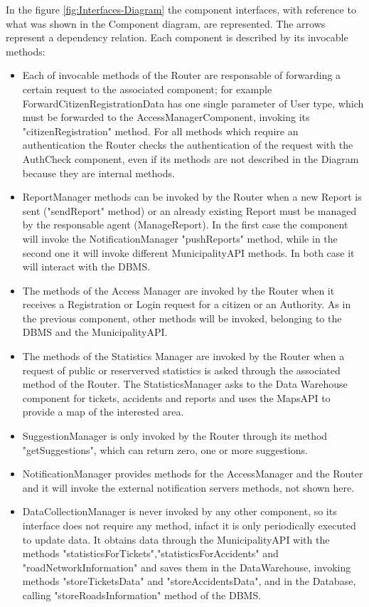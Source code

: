 \documentclass[a4paper]{report}
\begin{document}
In the figure \ref{fig:Interfaces-Diagram} the component interfaces, with reference to what was shown in the Component diagram, are represented. The arrows represent a dependency relation. Each component is described by its invocable methods:
\begin{itemize}
\item Each of invocable methods of the Router are responsable of forwarding a certain request to the associated component; for example ForwardCitizenRegistrationData has one single parameter of User type, which must be forwarded to the AccessManagerComponent, invoking its "citizenRegistration" method.
For all methods which require an authentication the Router checks the authentication of the request with the AuthCheck component, even if its methods are not described in the Diagram because they are internal methods.
\item ReportManager methods can be invoked by the Router when a new Report is sent ("sendReport" method) or an already existing Report must be managed by the responsable agent (ManageReport). In the first case the component will invoke the NotificationManager "pushReports" method, while in the second one it will invoke different MunicipalityAPI methods. In both case it will interact with the DBMS.
\item The methods of the Access Manager are invoked by the Router when it receives a Registration or Login request for a citizen or an Authority. As in the previous component, other methods will be invoked, belonging to the DBMS and the MunicipalityAPI.
\item The methods of the Statistics Manager are invoked by the Router when a request of public or reserverved statistics is asked through the associated method of the Router. The StatisticsManager asks to the Data Warehouse component for tickets, accidents and reports and uses the MapsAPI to provide a map of the interested area.
\item SuggestionManager is only invoked by the Router through its method "getSuggestions", which can return zero, one or more suggestions.
\item NotificationManager provides methods for the AccessManager and the Router and it will invoke the external notification servers methods, not shown here.
\item DataCollectionManager is never invoked by any other component, so its interface does not require any method, infact it is only periodically executed to update data. It obtains data through the MunicipalityAPI with the methods "statisticsForTickets","statisticsForAccidents" and "roadNetworkInformation" and saves them in the DataWarehouse, invoking methods "storeTicketsData" and "storeAccidentsData", and in the Database, calling "storeRoadsInformation" method of the DBMS.

\end{itemize}
\end{document}
